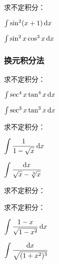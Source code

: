 \documentclass[14pt,notheorems,leqno,xcolor={rgb}]{beamer} %
\begin{document}
\begin{frame}
\begin{review}
求不定积分：
\begin{enumlite}
  \item $\int \sin^2(x+1) \mathop{}\!\mathrm{d}{x}$
  \item $\int \sin^2x\cos^3 x \mathop{}\!\mathrm{d}{x}$
\end{enumlite}
\end{review}
\end{frame}

\begin{iframe}
\frametitle{换元积分法}
\begin{review}
求不定积分：
\begin{enumlite}
\item $\int \sec^4x \tan^4 x \mathop{}\!\mathrm{d}{x}$
\item $\int \sec^3x \tan^3 x \mathop{}\!\mathrm{d}{x}$
\end{enumlite}
\end{review}
\end{iframe}

\begin{frame}
\begin{review}
求不定积分：
\begin{enumlite}
\item $\Int\dfrac{1}{1-\sqrt{x}} \d x$\pause
\item $\Int\dfrac{\d x}{\sqrt{x}-\sqrt[3]{x}}$
\end{enumlite}
\end{review}
\end{frame}

\begin{frame}
\begin{review}
求不定积分：
\begin{enumlite}
\end{enumlite}
\end{review}
\end{frame}

\begin{frame}
\begin{review}
求不定积分：
\begin{enumlite}
  \item $\Int\dfrac{1-x}{\sqrt{1-x^2}}\d x$\pause
  \item $\Int\dfrac{\d x}{\sqrt{(1+x^2)^3}}$
\end{enumlite}
\end{review}
\end{frame}
\end{document}
